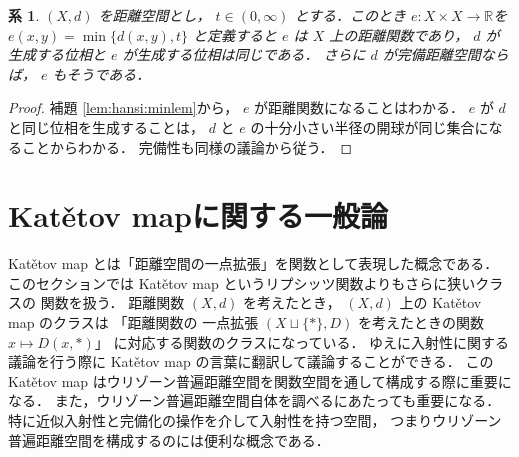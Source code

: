 \documentclass[leqno, 12pt]{jsarticle}
\newtheorem{cor}[thm]{系}
\newcommand{\rr}{\mathbb{R}}
\begin{document}
\begin{cor}\label{cor:hanasi:mindis}
$(X, d)$
を距離空間とし，
$t\in (0, \infty)$
とする．このとき
$e\colon  X\times X\to \rr$を
$e(x, y)=\min\{d(x, y), t\}$
と定義すると
$e$
は
$X$
上の距離関数であり，
$d$
が生成する位相と
$e$
が生成する位相は同じである．
さらに
$d$
が完備距離空間ならば，
$e$
もそうである．
\end{cor}
\begin{proof}
補題 
\ref{lem:hansi:minlem}から，
$e$
が距離関数になることはわかる．
$e$
が
$d$
と同じ位相を生成することは，
$d$
と
$e$
の十分小さい半径の開球が同じ集合になることからわかる．
完備性も同様の議論から従う．
\end{proof}






\section{Kat\v{e}tov mapに関する一般論}\label{sec:33333}
Kat\v{e}tov map
とは「距離空間の一点拡張」を関数として表現した概念である．
このセクションでは
Kat\v{e}tov map
というリプシッツ関数よりもさらに狭いクラスの
関数を扱う．
距離関数
$(X, d)$
を考えたとき，
$(X, d)$
上の
Kat\v{e}tov map
のクラスは
「距離関数の
一点拡張
$(X\sqcup\{*\}, D)$
を考えたときの関数
$x\mapsto D(x, *)$」
に対応する関数のクラスになっている．
ゆえに入射性に関する議論を行う際に
Kat\v{e}tov map
の言葉に翻訳して議論することができる．
この
Kat\v{e}tov map
はウリゾーン普遍距離空間を関数空間を通して構成する際に重要になる．
また，ウリゾーン普遍距離空間自体を調べるにあたっても重要になる．
特に近似入射性と完備化の操作を介して入射性を持つ空間，
つまりウリゾーン普遍距離空間を構成するのには便利な概念である．
\end{document}
